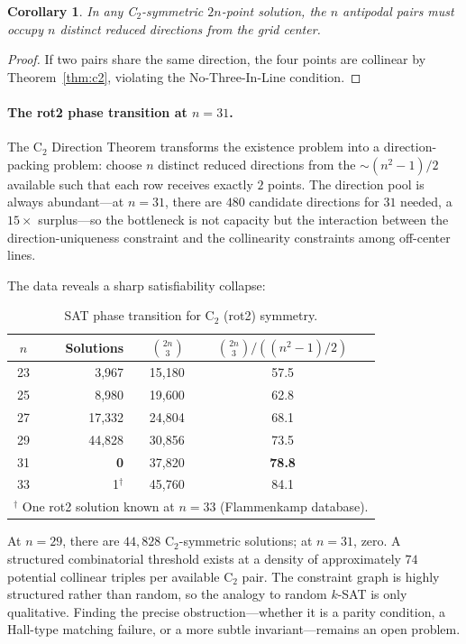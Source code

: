 \documentclass[11pt,a4paper]{article}
\theoremstyle{plain}
\newtheorem{corollary}[theorem]{Corollary}
\theoremstyle{definition}
\begin{document}
\begin{corollary}
\label{cor:c2dirs}
In any C$_2$-symmetric $2n$-point solution, the $n$ antipodal pairs must occupy $n$ distinct reduced directions from the grid center.
\end{corollary}

\begin{proof}
If two pairs share the same direction, the four points are collinear by Theorem~\ref{thm:c2}, violating the No-Three-In-Line condition.
\end{proof}

\paragraph{The rot2 phase transition at $n=31$.}
The C$_2$ Direction Theorem transforms the existence problem into a direction-packing problem: choose $n$ distinct reduced directions from the $\sim(n^2-1)/2$ available such that each row receives exactly $2$ points. The direction pool is always abundant---at $n=31$, there are $480$ candidate directions for $31$ needed, a $15\times$ surplus---so the bottleneck is not capacity but the interaction between the direction-uniqueness constraint and the collinearity constraints among off-center lines.

The data reveals a sharp satisfiability collapse:

\begin{table}[H]
\centering
\caption{SAT phase transition for C$_2$ (rot2) symmetry.}
\label{tab:rot2transition}
\begin{tabular}{crrc}
\toprule
$n$ & Solutions & $\binom{2n}{3}$ & $\binom{2n}{3} / ((n^2-1)/2)$ \\
\midrule
23 & 3,967 & 15,180 & 57.5 \\
25 & 8,980 & 19,600 & 62.8 \\
27 & 17,332 & 24,804 & 68.1 \\
29 & 44,828 & 30,856 & 73.5 \\
31 & \textbf{0} & 37,820 & \textbf{78.8} \\
33 & 1$^\dag$ & 45,760 & 84.1 \\
\bottomrule
\multicolumn{5}{l}{\footnotesize $^\dag$ One rot2 solution known at $n=33$ (Flammenkamp database).}
\end{tabular}
\end{table}

At $n=29$, there are $44{,}828$ C$_2$-symmetric solutions; at $n=31$, zero. A structured combinatorial threshold exists at a density of approximately $74$ potential collinear triples per available C$_2$ pair. The constraint graph is highly structured rather than random, so the analogy to random $k$-SAT is only qualitative. Finding the precise obstruction---whether it is a parity condition, a Hall-type matching failure, or a more subtle invariant---remains an open problem.
\end{document}
